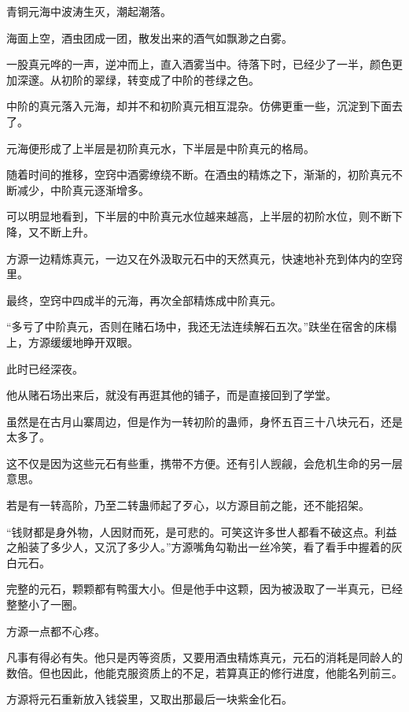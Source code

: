 
\begin{this_body}

青铜元海中波涛生灭，潮起潮落。

海面上空，酒虫团成一团，散发出来的酒气如飘渺之白雾。

一股真元哗的一声，逆冲而上，直入酒雾当中。待落下时，已经少了一半，颜色更加深邃。从初阶的翠绿，转变成了中阶的苍绿之色。

中阶的真元落入元海，却并不和初阶真元相互混杂。仿佛更重一些，沉淀到下面去了。

元海便形成了上半层是初阶真元水，下半层是中阶真元的格局。

随着时间的推移，空窍中酒雾缭绕不断。在酒虫的精炼之下，渐渐的，初阶真元不断减少，中阶真元逐渐增多。

可以明显地看到，下半层的中阶真元水位越来越高，上半层的初阶水位，则不断下降，又不断上升。

方源一边精炼真元，一边又在外汲取元石中的天然真元，快速地补充到体内的空窍里。

最终，空窍中四成半的元海，再次全部精炼成中阶真元。

“多亏了中阶真元，否则在赌石场中，我还无法连续解石五次。”趺坐在宿舍的床榻上，方源缓缓地睁开双眼。

此时已经深夜。

他从赌石场出来后，就没有再逛其他的铺子，而是直接回到了学堂。

虽然是在古月山寨周边，但是作为一转初阶的蛊师，身怀五百三十八块元石，还是太多了。

这不仅是因为这些元石有些重，携带不方便。还有引人觊觎，会危机生命的另一层意思。

若是有一转高阶，乃至二转蛊师起了歹心，以方源目前之能，还不能招架。

“钱财都是身外物，人因财而死，是可悲的。可笑这许多世人都看不破这点。利益之船装了多少人，又沉了多少人。”方源嘴角勾勒出一丝冷笑，看了看手中握着的灰白元石。

完整的元石，颗颗都有鸭蛋大小。但是他手中这颗，因为被汲取了一半真元，已经整整小了一圈。

方源一点都不心疼。

凡事有得必有失。他只是丙等资质，又要用酒虫精炼真元，元石的消耗是同龄人的数倍。但也因此，他能克服资质上的不足，若算真正的修行进度，他能名列前三。

方源将元石重新放入钱袋里，又取出那最后一块紫金化石。


\end{this_body}
